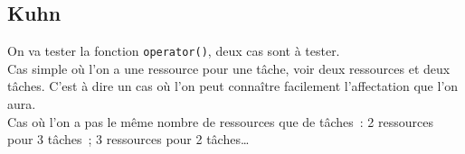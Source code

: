




\subsection{Kuhn}

On va tester la fonction \texttt{operator()}, deux cas sont à tester.\\
Cas simple où l'on a une ressource pour une tâche, voir deux ressources et deux tâches. C'est à dire un cas où l'on peut connaître facilement l'affectation que l'on aura.\\
Cas où l'on a pas le même nombre de ressources que de tâches~: 2 ressources pour 3 tâches~; 3 ressources pour 2 tâches\ldots
